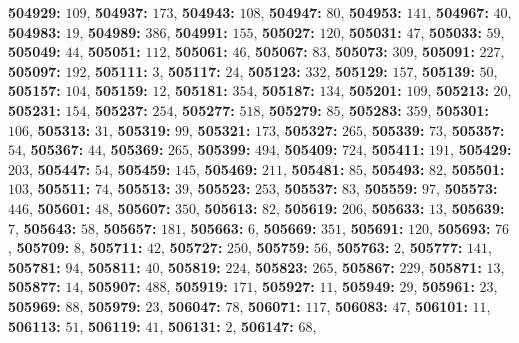 \textsf{\bfseries 504929:} $109$, \textsf{\bfseries 504937:} $173$, \textsf{\bfseries 504943:} $108$, \textsf{\bfseries 504947:} $80$, \textsf{\bfseries 504953:} $141$, \textsf{\bfseries 504967:} $40$, \textsf{\bfseries 504983:} $19$, \textsf{\bfseries 504989:} $386$, \textsf{\bfseries 504991:} $155$, \textsf{\bfseries 505027:} $120$, \textsf{\bfseries 505031:} $47$, \textsf{\bfseries 505033:} $59$, \textsf{\bfseries 505049:} $44$, \textsf{\bfseries 505051:} $112$, \textsf{\bfseries 505061:} $46$, \textsf{\bfseries 505067:} $83$, \textsf{\bfseries 505073:} $309$, \textsf{\bfseries 505091:} $227$, \textsf{\bfseries 505097:} $192$, \textsf{\bfseries 505111:} $3$, \textsf{\bfseries 505117:} $24$, \textsf{\bfseries 505123:} $332$, \textsf{\bfseries 505129:} $157$, \textsf{\bfseries 505139:} $50$, \textsf{\bfseries 505157:} $104$, \textsf{\bfseries 505159:} $12$, \textsf{\bfseries 505181:} $354$, \textsf{\bfseries 505187:} $134$, \textsf{\bfseries 505201:} $109$, \textsf{\bfseries 505213:} $20$, \textsf{\bfseries 505231:} $154$, \textsf{\bfseries 505237:} $254$, \textsf{\bfseries 505277:} $518$, \textsf{\bfseries 505279:} $85$, \textsf{\bfseries 505283:} $359$, \textsf{\bfseries 505301:} $106$, \textsf{\bfseries 505313:} $31$, \textsf{\bfseries 505319:} $99$, \textsf{\bfseries 505321:} $173$, \textsf{\bfseries 505327:} $265$, \textsf{\bfseries 505339:} $73$, \textsf{\bfseries 505357:} $54$, \textsf{\bfseries 505367:} $44$, \textsf{\bfseries 505369:} $265$, \textsf{\bfseries 505399:} $494$, \textsf{\bfseries 505409:} $724$, \textsf{\bfseries 505411:} $191$, \textsf{\bfseries 505429:} $203$, \textsf{\bfseries 505447:} $54$, \textsf{\bfseries 505459:} $145$, \textsf{\bfseries 505469:} $211$, \textsf{\bfseries 505481:} $85$, \textsf{\bfseries 505493:} $82$, \textsf{\bfseries 505501:} $103$, \textsf{\bfseries 505511:} $74$, \textsf{\bfseries 505513:} $39$, \textsf{\bfseries 505523:} $253$, \textsf{\bfseries 505537:} $83$, \textsf{\bfseries 505559:} $97$, \textsf{\bfseries 505573:} $446$, \textsf{\bfseries 505601:} $48$, \textsf{\bfseries 505607:} $350$, \textsf{\bfseries 505613:} $82$, \textsf{\bfseries 505619:} $206$, \textsf{\bfseries 505633:} $13$, \textsf{\bfseries 505639:} $7$, \textsf{\bfseries 505643:} $58$, \textsf{\bfseries 505657:} $181$, \textsf{\bfseries 505663:} $6$, \textsf{\bfseries 505669:} $351$, \textsf{\bfseries 505691:} $120$, \textsf{\bfseries 505693:} $76$, \textsf{\bfseries 505709:} $8$, \textsf{\bfseries 505711:} $42$, \textsf{\bfseries 505727:} $250$, \textsf{\bfseries 505759:} $56$, \textsf{\bfseries 505763:} $2$, \textsf{\bfseries 505777:} $141$, \textsf{\bfseries 505781:} $94$, \textsf{\bfseries 505811:} $40$, \textsf{\bfseries 505819:} $224$, \textsf{\bfseries 505823:} $265$, \textsf{\bfseries 505867:} $229$, \textsf{\bfseries 505871:} $13$, \textsf{\bfseries 505877:} $14$, \textsf{\bfseries 505907:} $488$, \textsf{\bfseries 505919:} $171$, \textsf{\bfseries 505927:} $11$, \textsf{\bfseries 505949:} $29$, \textsf{\bfseries 505961:} $23$, \textsf{\bfseries 505969:} $88$, \textsf{\bfseries 505979:} $23$, \textsf{\bfseries 506047:} $78$, \textsf{\bfseries 506071:} $117$, \textsf{\bfseries 506083:} $47$, \textsf{\bfseries 506101:} $11$, \textsf{\bfseries 506113:} $51$, \textsf{\bfseries 506119:} $41$, \textsf{\bfseries 506131:} $2$, \textsf{\bfseries 506147:} $68$, 
